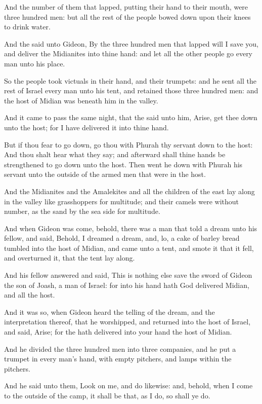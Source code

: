 \verse And the number of them that lapped, putting their hand to their mouth, were three hundred men: but all the rest of the people bowed down upon their knees to drink water.

\verse And the \LORD said unto Gideon, By the three hundred men that lapped will I save you, and deliver the Midianites into thine hand: and let all the other people go every man unto his place.

\verse So the people took victuals in their hand, and their trumpets: and he sent all the rest of Israel every man unto his tent, and retained those three hundred men: and the host of Midian was beneath him in the valley.

\verse And it came to pass the same night, that the \LORD said unto him, Arise, get thee down unto the host; for I have delivered it into thine hand.

\verse But if thou fear to go down, go thou with Phurah thy servant down to the host: \verse And thou shalt hear what they say; and afterward shall thine hands be strengthened to go down unto the host. Then went he down with Phurah his servant unto the outside of the armed men that were in the host.

\verse And the Midianites and the Amalekites and all the children of the east lay along in the valley like grasshoppers for multitude; and their camels were without number, as the sand by the sea side for multitude.

\verse And when Gideon was come, behold, there was a man that told a dream unto his fellow, and said, Behold, I dreamed a dream, and, lo, a cake of barley bread tumbled into the host of Midian, and came unto a tent, and smote it that it fell, and overturned it, that the tent lay along.

\verse And his fellow answered and said, This is nothing else save the sword of Gideon the son of Joash, a man of Israel: for into his hand hath God delivered Midian, and all the host.

\verse And it was so, when Gideon heard the telling of the dream, and the interpretation thereof, that he worshipped, and returned into the host of Israel, and said, Arise; for the \LORD hath delivered into your hand the host of Midian.

\verse And he divided the three hundred men into three companies, and he put a trumpet in every man's hand, with empty pitchers, and lamps within the pitchers.

\verse And he said unto them, Look on me, and do likewise: and, behold, when I come to the outside of the camp, it shall be that, as I do, so shall ye do.

